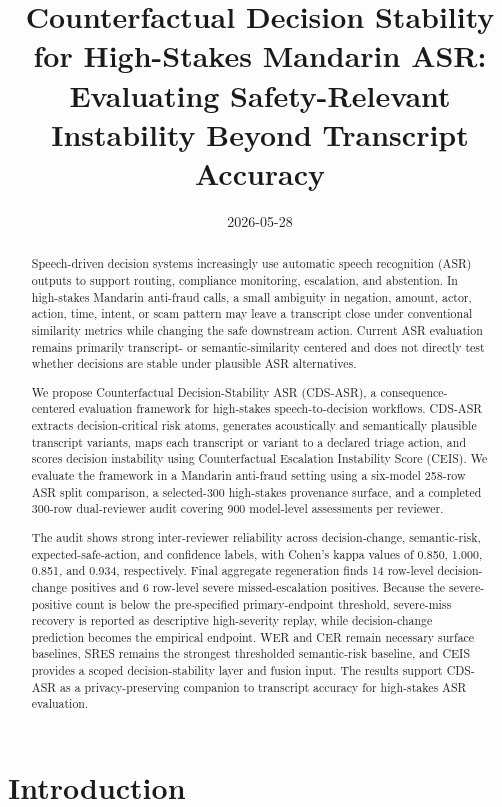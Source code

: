 \documentclass[
]{article}
\title{Counterfactual Decision Stability for High-Stakes Mandarin ASR:
Evaluating Safety-Relevant Instability Beyond Transcript Accuracy}
\author{}
\date{2026-05-28}
\begin{document}
\sloppy
\maketitle
\begin{abstract}
Speech-driven decision systems increasingly use automatic speech
recognition (ASR) outputs to support routing, compliance monitoring,
escalation, and abstention. In high-stakes Mandarin anti-fraud calls, a
small ambiguity in negation, amount, actor, action, time, intent, or scam
pattern may leave a transcript close under conventional similarity
metrics while changing the safe downstream action. Current ASR
evaluation remains primarily transcript- or semantic-similarity centered
and does not directly test whether decisions are stable under plausible
ASR alternatives.

We propose Counterfactual Decision-Stability ASR (CDS-ASR), a
consequence-centered evaluation framework for high-stakes
speech-to-decision workflows. CDS-ASR extracts decision-critical risk
atoms, generates acoustically and semantically plausible transcript
variants, maps each transcript or variant to a declared triage action,
and scores decision instability using Counterfactual Escalation
Instability Score (CEIS). We evaluate the framework in a Mandarin
anti-fraud setting using a six-model 258-row ASR split comparison, a
selected-300 high-stakes provenance surface, and a completed 300-row
dual-reviewer audit covering 900 model-level assessments per reviewer.

The audit shows strong inter-reviewer reliability across
decision-change, semantic-risk, expected-safe-action, and confidence
labels, with Cohen's kappa values of 0.850, 1.000, 0.851, and 0.934,
respectively. Final aggregate regeneration finds 14 row-level
decision-change positives and 6 row-level severe missed-escalation
positives. Because the severe-positive count is below the pre-specified
primary-endpoint threshold, severe-miss recovery is reported as
descriptive high-severity replay, while decision-change prediction
becomes the empirical endpoint. WER and CER remain necessary surface
baselines, SRES remains the strongest thresholded semantic-risk
baseline, and CEIS provides a scoped decision-stability layer and fusion
input. The results support CDS-ASR as a privacy-preserving companion to
transcript accuracy for high-stakes ASR evaluation.
\end{abstract}

\hypertarget{introduction}{%
\section{Introduction}\label{introduction}}
\end{document}
